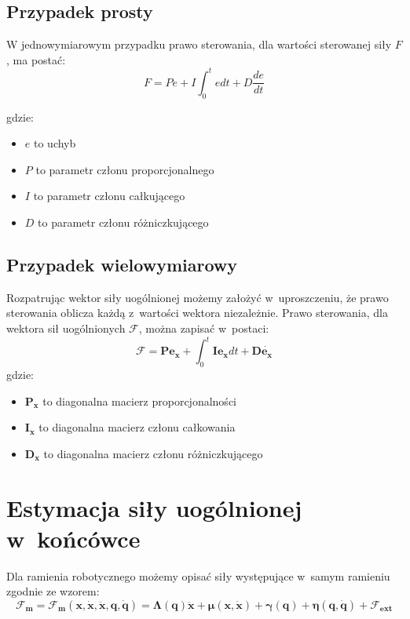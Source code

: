 \subsection{Przypadek prosty}
W jednowymiarowym przypadku prawo sterowania, dla wartości sterowanej siły $F$, ma postać:
\begin{equation}
F = Pe + I\int_{0}^{t}e dt + D\frac{de}{dt}
\end{equation}

gdzie:
\begin{itemize}
	\item $e$ to uchyb
	\item $P$ to parametr członu proporcjonalnego
	\item $I$ to parametr członu całkującego
	\item $D$ to parametr członu różniczkującego
\end{itemize}


\subsection{Przypadek wielowymiarowy}
Rozpatrując wektor siły uogólnionej możemy założyć w~uproszczeniu, że prawo sterowania oblicza każdą z~wartości wektora niezależnie. Prawo sterowania, dla wektora sił uogólnionych $\boldsymbol{\mathcal{F}}$, można zapisać w~postaci:
\begin{equation}
\boldsymbol{\mathcal{F}} = \boldsymbol{P}\boldsymbol{e_x} +\int_{0}^{t}  \boldsymbol{I}\boldsymbol{e_x}dt + \boldsymbol{D}\dot{\boldsymbol{e_x}}
\end{equation}
gdzie:
\begin{itemize}
	\item $\boldsymbol{P_x}$ to diagonalna macierz proporcjonalności
	\item $\boldsymbol{I_x}$ to diagonalna macierz członu całkowania
	\item $\boldsymbol{D_x}$ to diagonalna macierz członu różniczkującego
\end{itemize}

\section{Estymacja siły uogólnionej w~końcówce}
\label{chap:estymacja}
Dla ramienia robotycznego możemy opisać siły występujące w~samym ramieniu zgodnie ze wzorem:
\begin{equation}
\boldsymbol{\mathcal{F}_m} = \boldsymbol{\mathcal{F}_m}(\boldsymbol{x}, \dot{\boldsymbol{x}}, \ddot{\boldsymbol{x}}, \boldsymbol{q}, \dot{\boldsymbol{q}}) = \boldsymbol{\Lambda}(\boldsymbol{q})\boldsymbol{\ddot{x}} + \boldsymbol{\mu}(\boldsymbol{x}, \boldsymbol{\dot{x}}) + \boldsymbol{\gamma}(\boldsymbol{q}) + \boldsymbol{\eta}(\boldsymbol{q}, \boldsymbol{\dot{q}}) + \boldsymbol{\mathcal{F}_{ext}}
\label{eq:ramie}
\end{equation}

